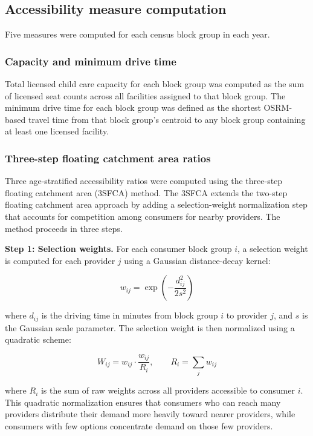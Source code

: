 \documentclass{CUP-JNL-DAP}%
\begin{document}
\subsection{Accessibility measure computation}

Five measures were computed for each census block group in each year.

\subsubsection{Capacity and minimum drive time}

Total licensed child care capacity for each block group was computed as the sum of licensed seat counts across all facilities assigned to that block group. The minimum drive time for each block group was defined as the shortest OSRM-based travel time from that block group's centroid to any block group containing at least one licensed facility.

\subsubsection{Three-step floating catchment area ratios}

Three age-stratified accessibility ratios were computed using the three-step floating catchment area (3SFCA) method\citep{wan2012}. The 3SFCA extends the two-step floating catchment area approach\citep{luo2003,luo2009} by adding a selection-weight normalization step that accounts for competition among consumers for nearby providers. The method proceeds in three steps.

\textbf{Step 1: Selection weights.} For each consumer block group $i$, a selection weight is computed for each provider $j$ using a Gaussian distance-decay kernel:

\begin{equation}
w_{ij} = \exp\!\left(-\frac{d_{ij}^{2}}{2s^{2}}\right)
\end{equation}

\noindent where $d_{ij}$ is the driving time in minutes from block group $i$ to provider $j$, and $s$ is the Gaussian scale parameter. The selection weight is then normalized using a quadratic scheme:

\begin{equation}
W_{ij} = w_{ij} \cdot \frac{w_{ij}}{R_{i}}, \qquad R_{i} = \sum_{j} w_{ij}
\end{equation}

\noindent where $R_{i}$ is the sum of raw weights across all providers accessible to consumer $i$. This quadratic normalization ensures that consumers who can reach many providers distribute their demand more heavily toward nearer providers, while consumers with few options concentrate demand on those few providers\citep{wan2012}.
\end{document}
